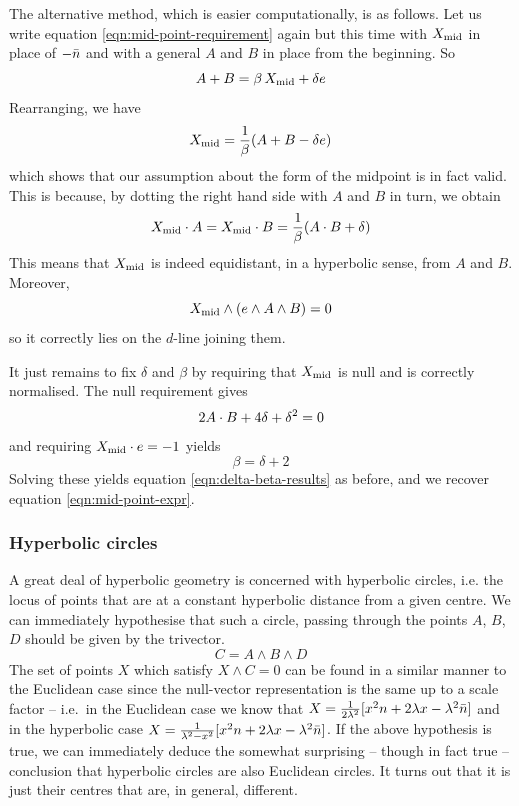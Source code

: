 The alternative method, which is easier computationally, is as
follows. Let us write equation \ref{eqn:mid-point-requirement}
again but this time with $X_{\rm mid}$ in place of $-\bar{n}$ and with
a general $A$ and $B$ in place from the beginning. So
%
\begin{equation}
A+B = \beta \, X_{\rm mid} + \delta e
\end{equation}
%
Rearranging, we have
%
\begin{equation}
X_{\rm mid} = \frac{1}{\beta} (A+B-\delta e)
\end{equation}
%
which shows that our assumption about the form of the
midpoint is in fact valid. This is because, by dotting the
right hand side with $A$ and $B$ in turn, we obtain
%
\begin{equation}
X_{\rm mid} \cdot A = X_{\rm mid} \cdot B = \frac{1}{\beta}
(A\cdot B+\delta)
\end{equation}
%
This means that $X_{\rm mid}$ is indeed equidistant, in a
hyperbolic sense, from $A$ and $B$. Moreover,
%
\begin{equation}
X_{\rm mid} \wedge (e \wedge A \wedge B) = 0
\end{equation}
%
so it correctly lies on the $d$-line joining them.

It just remains to fix $\delta$ and $\beta$ by requiring
that $X_{\rm mid}$ is null and is correctly normalised.
The null requirement gives
%
\begin{equation}
2 A \cdot B + 4 \delta + \delta^2 = 0
\end{equation}
%
and requiring $X_{\rm mid} \cdot e = -1$ yields
%
\begin{equation}
\beta=\delta+2
\end{equation}
%
Solving these yields equation \ref{eqn:delta-beta-results} as
before, and we recover equation \ref{eqn:mid-point-expr}.

\subsubsection{Hyperbolic circles}

A great deal of hyperbolic geometry is concerned with
hyperbolic circles, i.e. the locus of points that are
at a constant hyperbolic distance from a given centre.
We can immediately hypothesise that such a circle,
passing through the points $A$, $B$, $D$  should be given
by the trivector.
%
\begin{equation}
C = A \wedge B \wedge D
\end{equation}
%
The set of points $X$ which satisfy $X\wedge C=0$ can be found
in a similar manner to the Euclidean case since the null-vector
representation is the same up to a scale factor -- 
i.e.\ in the Euclidean case we know that $X =
\frac{1}{2\lambda^2}[x^2n + 2\lambda x - \lambda^2\bar{n}]$ and in the
hyperbolic case $X = \frac{1}{\lambda^2 - x^2}[x^2n + 2\lambda
x - \lambda^2\bar{n}]$.
If the above hypothesis is true, we can
immediately deduce the somewhat surprising -- though in fact true --
conclusion that hyperbolic circles are also Euclidean circles.
It turns out that it is just their centres that are, in general,
different.

